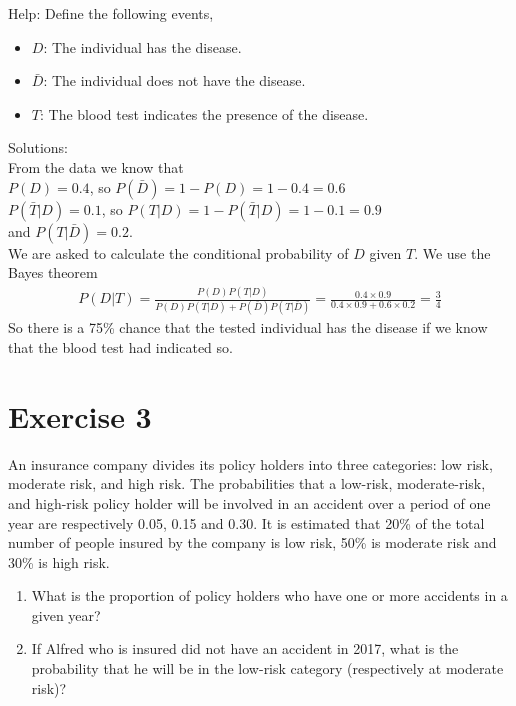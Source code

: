 \documentclass[12pt,thmsa]{article}
\begin{document}
Help: Define the following events,
\begin{itemize}
\item $ D $: The individual has the disease.
\item $ \bar{D} $: The individual does not have the disease.
\item $ T $: The blood test indicates the presence of the disease.
\end{itemize}

\noindent Solutions:\\

\noindent From the data we know that \\
$ P(D)=0.4 $, so $ P(\bar{D})=1-P(D)=1-0.4=0.6 $\\
$ P(\bar{T} | D)=0.1 $, so $P(T|D)=1- P(\bar{T} | D)=1-0.1=0.9$\\
and $ P(T | \bar{D})=0.2 $. \\
We are asked to calculate the conditional probability of $D $ given $T $.  We use the Bayes theorem
\begin{align*}
P(D|T)=\frac{P(D)P(T|D)}{P(D)P(T|D)+P(\bar{D})P(T|\bar{D})}=\frac{0.4\times0.9}{0.4\times0.9+0.6\times0.2}=\frac{3}{4}
\end{align*}
So there is a 75\% chance that the tested individual has the disease if we know that the blood test had indicated so.


\section*{Exercise 3}

An insurance company divides its policy holders into three categories: low risk, moderate risk, and high risk. The probabilities that a low-risk, moderate-risk, and high-risk policy holder will be involved in an accident over a period of one year are respectively 0.05, 0.15 and 0.30. It is estimated that 20\% of the total number of people insured by the company is low risk, 50\% is moderate risk and 30\% is high risk. 

\begin{enumerate}
	\item What is the proportion of policy holders who have one or more accidents in a given year?
	\item If Alfred who is insured did not have an accident in 2017, what is the probability that he will be in the low-risk category (respectively at moderate risk)?
\end{enumerate}
\end{document}
